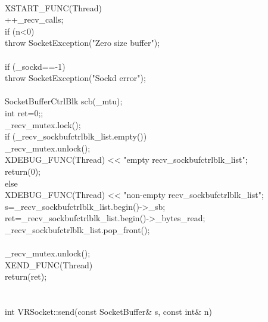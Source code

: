 \documentclass{article}
\begin{document}
 {
\\
         XSTART_FUNC(Thread)
\\
         ++_recv_calls;
\\
     if (n<0) {
\\
         throw SocketException("Zero size buffer");
\\
     }
\\
     if (_sockd==-1) {
\\
         throw SocketException("Sockd error");
\\
     }
\\
     SocketBufferCtrlBlk scb(_mtu);
\\
         int ret=0;;
\\
     _recv_mutex.lock();
\\
         if (_recv_sockbufctrlblk_list.empty()) {
\\
         _recv_mutex.unlock();
\\
                 XDEBUG_FUNC(Thread) << "empty recv_sockbufctrlblk_list\n";
\\
                 return(0);
\\
         } else {
\\
                 XDEBUG_FUNC(Thread) << "non-empty recv_sockbufctrlblk_list\n";
\\
                 s=_recv_sockbufctrlblk_list.begin()->_sb;
\\
                 ret=_recv_sockbufctrlblk_list.begin()->_bytes_read;
\\
         _recv_sockbufctrlblk_list.pop_front();
\\
         }       
\\
     _recv_mutex.unlock();
\\
         XEND_FUNC(Thread)
\\
     return(ret);
\\
 }
\\
 
\\
 int VRSocket::send(const SocketBuffer& s, const int& n)
\\
\end{document}
